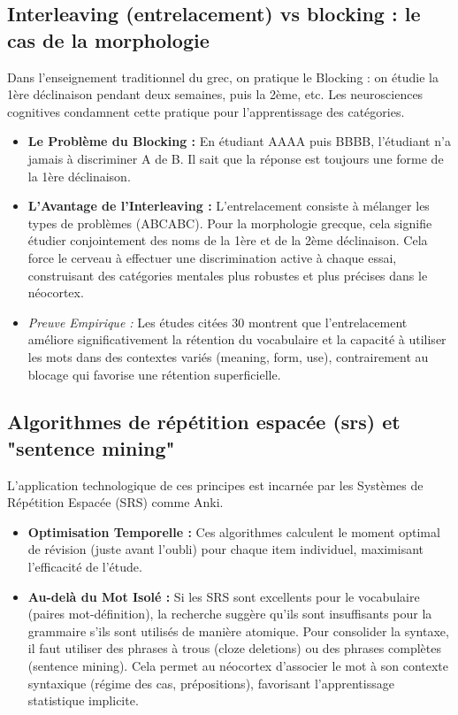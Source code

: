 \subsection{Interleaving (entrelacement) vs blocking : le cas de la morphologie}

Dans l'enseignement traditionnel du grec, on pratique le \og Blocking\fg{} : on étudie la 1ère
déclinaison pendant deux semaines, puis la 2ème, etc. Les neurosciences cognitives condamnent cette
pratique pour l'apprentissage des catégories.

\begin{itemize}\item \textbf{Le Problème du Blocking :} En étudiant \og AAAA\fg{} puis \og BBBB\fg{}, l'étudiant n'a jamais à discriminer A de B. Il sait que la réponse est toujours une forme de la 1ère déclinaison.\item \textbf{L'Avantage de l'Interleaving :} L'entrelacement consiste à mélanger les types de problèmes (\og ABCABC\fg{}). Pour la morphologie grecque, cela signifie étudier conjointement des noms de la 1ère et de la 2ème déclinaison. Cela force le cerveau à effectuer une discrimination active à chaque essai, construisant des catégories mentales plus robustes et plus précises dans le néocortex.\cite{III-3-1-ref30}\item \textit{Preuve Empirique :} Les études citées 30 montrent que l'entrelacement améliore significativement la rétention du vocabulaire et la capacité à utiliser les mots dans des contextes variés (meaning, form, use), contrairement au blocage qui favorise une rétention superficielle.\end{itemize}

\subsection{Algorithmes de répétition espacée (srs) et "sentence mining"}

L'application technologique de ces principes est incarnée par les Systèmes de Répétition Espacée
(SRS) comme Anki.

\begin{itemize}\item \textbf{Optimisation Temporelle :} Ces algorithmes calculent le moment optimal de révision (juste avant l'oubli) pour chaque item individuel, maximisant l'efficacité de l'étude.\cite{III-3-1-ref33}\item \textbf{Au-delà du Mot Isolé :} Si les SRS sont excellents pour le vocabulaire (paires mot-définition), la recherche suggère qu'ils sont insuffisants pour la grammaire s'ils sont utilisés de manière atomique. Pour consolider la syntaxe, il faut utiliser des \og phrases à trous\fg{} (cloze deletions) ou des phrases complètes (\og sentence mining\fg{}). Cela permet au néocortex d'associer le mot à son contexte syntaxique (régime des cas, prépositions), favorisant l'apprentissage statistique implicite.\cite{III-3-1-ref35}\end{itemize}

